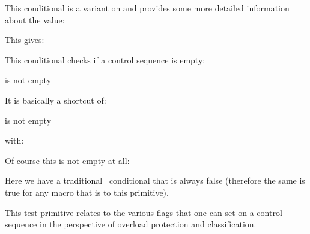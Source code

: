 \stopnewprimitive

\startnewprimitive[title={\prm {ifdimval}}]

This conditional is a variant on  and provides some more
detailed information about the value:

\stopbuffer

\typebuffer

This gives:

{\getbuffer}

\stopnewprimitive

\startnewprimitive[title={\prm {ifempty}}]

This conditional checks if a control sequence is empty:

\starttyping
is \ifempty\MyMacro \else not \fi empty
\stoptyping

It is basically a shortcut of:

\starttyping
is \ifx\MyMacro\empty \else not \fi empty
\stoptyping

with:

\starttyping
\def\empty{}
\stoptyping

Of course this is not empty at all:

\starttyping
\def\notempty#1{}
\stoptyping

\stopnewprimitive

\startoldprimitive[title={\prm {iffalse}}]

Here we have a traditional \TEX\ conditional that is always false (therefore the
same is true for any macro that is  to this primitive).

\stopoldprimitive

\startnewprimitive[title={\prm {ifflags}}]

This test primitive relates to the various flags that one can set on a control
sequence in the perspective of overload protection and classification.

\startbuffer
\protected\untraced\tolerant{}
\permanent\constant         {}
\stopbuffer

\typebuffer

